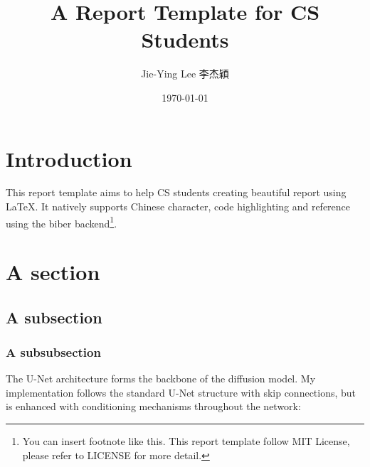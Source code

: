 \documentclass[a4paper,twocolumn]{article}  %
\title{A Report Template for CS Students}
\author{Jie-Ying Lee 李杰穎}
\date{\today}
\begin{document}
\maketitle
\section{Introduction}

This report template aims to help CS students creating beautiful report using \LaTeX. It natively supports Chinese character, code highlighting and reference using the biber backend\footnote{You can insert footnote like this. This report template follow MIT License, please refer to LICENSE for more detail.}.

\section{A section}
\subsection{A subsection}
\subsubsection{A subsubsection}

The U-Net architecture forms the backbone of the diffusion model. My implementation follows the standard U-Net structure with skip connections, but is enhanced with conditioning mechanisms throughout the network:
\end{document}
